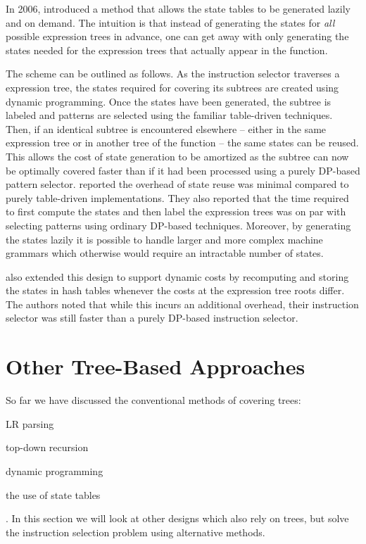 In 2006, \textcite{ErtlEtAl:2006} introduced a method that allows the
\gls{state} tables to be generated lazily and on demand.
%
The intuition is that instead of generating the \glspl{state} for \emph{all}
possible \glspl{expression tree} in advance, one can get away with only
generating the \glspl{state} needed for the \glspl{expression tree} that
actually appear in the \gls{function}.

The scheme can be outlined as follows.
%
As the \gls{instruction selector} traverses a \gls{expression tree}, the
\glspl{state} required for covering its \glspl{subtree} are created using
dynamic programming.
%
Once the \glspl{state} have been generated, the \gls{subtree} is labeled and
\glspl{pattern} are selected using the familiar table-driven techniques.
%
Then, if an identical \gls{subtree} is encountered elsewhere -- either in the
same \gls{expression tree} or in another \gls{tree} of the \gls{function} -- the
same \glspl{state} can be reused.
%
This allows the cost of \gls{state} generation to be amortized as the
\gls{subtree} can now be optimally covered faster than if it had been processed
using a purely \gls{DP}-based \gls{pattern selector}.
%
\citeauthor{ErtlEtAl:2006} reported the overhead of \gls{state} reuse was
minimal compared to purely table-driven implementations.
%
They also reported that the time required to first compute the \glspl{state} and
then label the \glspl{expression tree} was on par with selecting \glspl{pattern}
using ordinary \gls{DP}-based techniques.
%
Moreover, by generating the \glspl{state} lazily it is possible to handle larger
and more complex \glspl{machine grammar} which otherwise would require an
intractable number of \glspl{state}.

\citeauthor{ErtlEtAl:2006} also extended this design to support dynamic costs by
recomputing and storing the \glspl{state} in hash tables whenever the costs at
the \gls{expression tree} \glspl{root} differ.
%
The authors noted that while this incurs an additional overhead, their
\gls{instruction selector} was still faster than a purely \gls{DP}-based
\gls{instruction selector}.


\section{Other Tree-Based Approaches}

So far we have discussed the conventional methods of covering \glspl{tree}:
%
\begin{inlinelist}[itemjoin={, }, itemjoin*={, and}]
  \item \gls{LR parsing}
  \item top-down recursion
  \item dynamic programming
  \item the use of \gls{state} tables
\end{inlinelist}.
%
In this section we will look at other designs which also rely on \glspl{tree},
but solve the \gls{instruction selection} problem using alternative methods.


